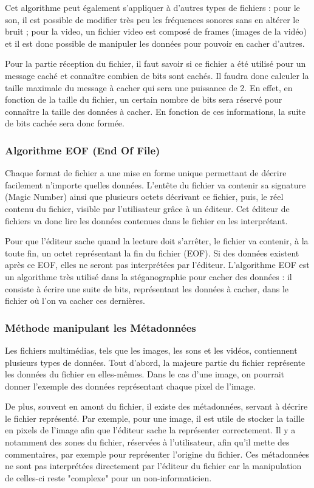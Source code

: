 \documentclass[11pt]{article}
\begin{document}
Cet algorithme peut également s'appliquer à d'autres types de fichiers : pour le son, il est possible de modifier très peu les fréquences sonores sans en altérer le bruit ; 
pour la video, un fichier video est composé de frames (images de la vidéo) et il est donc possible de manipuler les données pour pouvoir en cacher d'autres. 

Pour la partie réception du fichier, il faut savoir si ce fichier a été utilisé pour un message caché et connaître combien de bits sont cachés. 
Il faudra donc calculer la taille maximale du message à cacher qui sera une puissance de 2. En effet, en fonction de la taille du fichier, un certain nombre de bits sera réservé pour connaître la taille 
des données à cacher. 
En fonction de ces informations, la suite de bits cachée sera donc formée.

\subsubsection{Algorithme EOF (End Of File)}
Chaque format de fichier a une mise en forme unique permettant de décrire facilement n'importe quelles données. 
L'entête du fichier va contenir sa signature (Magic Number) ainsi que plusieurs octets décrivant ce fichier, puis, le réel contenu du fichier, visible par l'utilisateur grâce à un éditeur. 
Cet éditeur de fichiers va donc lire les données contenues dans le fichier en les interprétant. 

Pour que l'éditeur sache quand la lecture doit s'arrêter, le fichier va contenir, à la toute fin, un octet représentant la fin du fichier (EOF). 
Si des données existent après ce EOF, elles ne seront pas interprétées par l'éditeur. 
L'algorithme EOF est un algorithme très utilisé dans la stéganographie pour cacher des données : il consiste à écrire une suite de bits, représentant les données à cacher, dans le fichier où l'on va cacher ces dernières. 

\subsubsection{Méthode manipulant les Métadonnées}
Les fichiers multimédias, tels que les images, les sons et les vidéos, contiennent plusieurs types de données. 
Tout d'abord, la majeure partie du fichier représente les données du fichier en elles-mêmes. Dans le cas d'une image, on pourrait donner l'exemple des données représentant chaque pixel de l'image. 

De plus, souvent en amont du fichier, il existe des métadonnées, servant à décrire le fichier représenté. Par exemple, pour une image, il est utile de stocker la taille en pixels de l'image afin que l'éditeur sache la représenter correctement. 
Il y a notamment des zones du fichier, réservées à l'utilisateur, afin qu'il mette des commentaires, par exemple pour représenter l'origine du fichier. 
Ces métadonnées ne sont pas interprétées directement par l'éditeur du fichier car la manipulation de celles-ci reste "complexe" pour un non-informaticien. 
\end{document}
